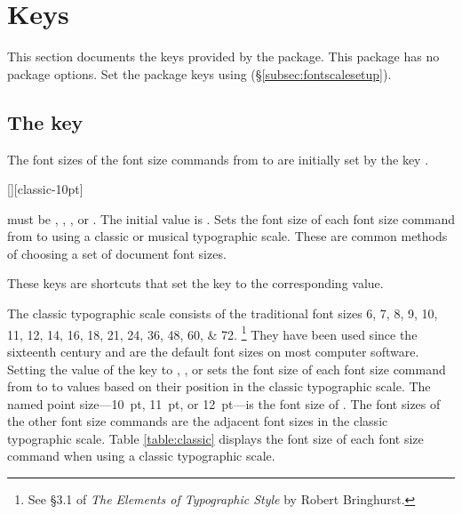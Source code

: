 \documentclass{beery}
\begin{document}
\section{Keys}
\label{sec:keys}

This section documents the keys provided by the  package.
This package has no package options.
Set the package keys using  (\S\ref{subsec:fontscalesetup}).

\subsection{The key }
\label{subsec:typographicscale}

The font sizes of the font size commands from  to  are initially set by the key .

\begin{displaycode}
  [][classic-10pt]
\end{displaycode}

 must be , , , or .
The initial value is .
Sets the font size of each font size command from  to  using a classic or musical typographic scale.
These are common methods of choosing a set of document font sizes.

\begin{displaycode}
  \nopagebreak\newline
  \newline
  \nopagebreak\newline
\end{displaycode}

These keys are shortcuts that set the key  to the corresponding value.

The classic typographic scale consists of the traditional font sizes
\numlist{6;7;8;9;10;11;12;14;16;18;21;24;36;48;60;72}.%
\footnote{See \S3.1 of \textit{The Elements of Typographic Style} by Robert Bringhurst.}
They have been used since the sixteenth century and are the default font sizes on most computer software.
Setting the value of the key  to , , or  sets the font size of each font size command from  to  to values based on their position in the classic typographic scale.
The named point size---\qty{10}{pt}, \qty{11}{pt}, or \qty{12}{pt}---is the font size of .
The font sizes of the other font size commands are the adjacent font sizes in the classic typographic scale.
Table \ref{table:classic} displays the font size of each font size command when using a classic typographic scale.
\end{document}
